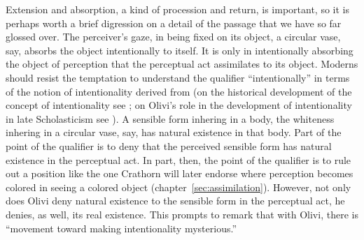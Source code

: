 Extension and absorption, a kind of procession and return, is important, so it is perhaps worth a brief digression on a detail of the passage that we have so far glossed over. The perceiver's gaze, in being fixed on its object, a circular vase, say, absorbs the object intentionally to itself. It is only in intentionally absorbing the object of perception that the perceptual act assimilates to its object. Moderns should resist the temptation to understand the qualifier ``intentionally'' in terms of the notion of intentionality derived from \citet{Brentano:1874aa} (on the historical development of the concept of intentionality see \citealt{Sorabji:2003fk}; on Olivi's role in the development of intentionality in late Scholasticism see \citealt[chapter 2]{Pasnau:1997aa}). A sensible form inhering in a body, the whiteness inhering in a circular vase, say, has natural existence in that body. Part of the point of the qualifier is to deny that the perceived sensible form has natural existence in the perceptual act. In part, then, the point of the qualifier is to rule out a position like the one Crathorn will later endorse where perception becomes colored in seeing a colored object (chapter~\ref{sec:assimilation}). However, not only does Olivi deny natural existence to the sensible form in the perceptual act, he denies, as well, its real existence. This prompts \citet[67]{Pasnau:1997aa} to remark that with Olivi, there is ``movement toward making intentionality mysterious.''

